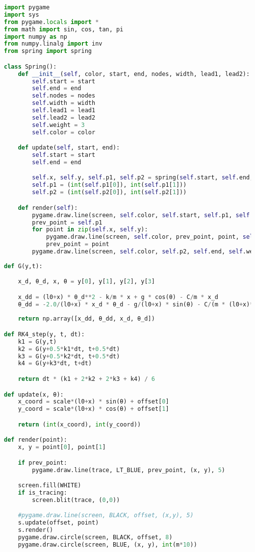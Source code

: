         \begin{lstlisting}[language=Python, caption=\textit{Path Animation Python Script for system \textbf{with} Damping}]
import pygame
import sys
from pygame.locals import *
from math import sin, cos, tan, pi
import numpy as np
from numpy.linalg import inv
from spring import spring

class Spring():
	def __init__(self, color, start, end, nodes, width, lead1, lead2):
		self.start = start
		self.end = end
		self.nodes = nodes
		self.width = width
		self.lead1 = lead1
		self.lead2 = lead2
		self.weight = 3
		self.color = color

	def update(self, start, end):
		self.start = start
		self.end = end

		self.x, self.y, self.p1, self.p2 = spring(self.start, self.end, self.nodes, self.width, self.lead1, self.lead2)
		self.p1 = (int(self.p1[0]), int(self.p1[1]))
		self.p2 = (int(self.p2[0]), int(self.p2[1]))

	def render(self):
		pygame.draw.line(screen, self.color, self.start, self.p1, self.weight)
		prev_point = self.p1
		for point in zip(self.x, self.y):
			pygame.draw.line(screen, self.color, prev_point, point, self.weight)
			prev_point = point
		pygame.draw.line(screen, self.color, self.p2, self.end, self.weight)
	
def G(y,t): 

	x_d, θ_d, x, θ = y[0], y[1], y[2], y[3]

	x_dd = (l0+x) * θ_d**2 - k/m * x + g * cos(θ) - C/m * x_d		
	θ_dd = -2.0/(l0+x) * x_d * θ_d - g/(l0+x) * sin(θ) - C/(m * (l0+x)**2) * θ_d	
	
	return np.array([x_dd, θ_dd, x_d, θ_d])

def RK4_step(y, t, dt):
	k1 = G(y,t)
	k2 = G(y+0.5*k1*dt, t+0.5*dt)
	k3 = G(y+0.5*k2*dt, t+0.5*dt)
	k4 = G(y+k3*dt, t+dt)

	return dt * (k1 + 2*k2 + 2*k3 + k4) / 6

def update(x, θ):
	x_coord = scale*(l0+x) * sin(θ) + offset[0]
	y_coord = scale*(l0+x) * cos(θ) + offset[1]

	return (int(x_coord), int(y_coord))

def render(point):
	x, y = point[0], point[1]

	if prev_point:
		pygame.draw.line(trace, LT_BLUE, prev_point, (x, y), 5)

	screen.fill(WHITE)	
	if is_tracing:
		screen.blit(trace, (0,0))

	#pygame.draw.line(screen, BLACK, offset, (x,y), 5)
	s.update(offset, point)
	s.render()
	pygame.draw.circle(screen, BLACK, offset, 8)
	pygame.draw.circle(screen, BLUE, (x, y), int(m*10))


\end{lstlisting}
